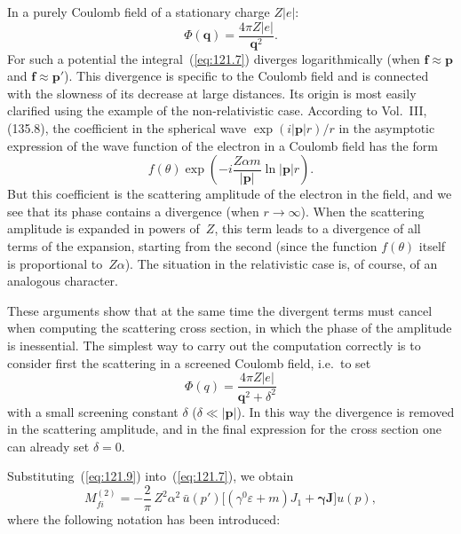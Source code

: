 
In a purely Coulomb field of a stationary charge $Z|e|$:
\[
\Phi(\mathbf{q}) = \frac{4\pi Z|e|}{\mathbf{q}^2}.
\]
For such a potential the integral~(\ref{eq:121.7}) diverges logarithmically (when $\mathbf{f} \approx \mathbf{p}$ and $\mathbf{f} \approx \mathbf{p}'$). This divergence is specific to the Coulomb field and is connected with the slowness of its decrease at large distances. Its origin is most easily clarified using the example of the non-relativistic case. According to Vol.~III, (135.8), the coefficient in the spherical wave $\exp(i|\mathbf{p}|r)/r$ in the asymptotic expression of the wave function of the electron in a Coulomb field has the form
\[
f(\theta)\exp\!\left(-i\frac{Z\alpha m}{|\mathbf{p}|}\ln|\mathbf{p}|r\right)\!.
\]
But this coefficient is the scattering amplitude of the electron in the field, and we see that its phase contains a divergence (when $r \to \infty$). When the scattering amplitude is expanded in powers of~$Z$, this term leads to a divergence of all terms of the expansion, starting from the second (since the function $f(\theta)$ itself is proportional to~$Z\alpha$). The situation in the relativistic case is, of course, of an analogous character.

These arguments show that at the same time the divergent terms must cancel when computing the scattering cross section, in which the phase of the amplitude is inessential. The simplest way to carry out the computation correctly is to consider first the scattering in a screened Coulomb field, i.e.\ to set
\begin{equation}
\Phi(q) = \frac{4\pi Z|e|}{\mathbf{q}^2 + \delta^2}
\label{eq:121.9}
\end{equation}
with a small screening constant $\delta$ ($\delta \ll |\mathbf{p}|$). In this way the divergence is removed in the scattering amplitude, and in the final expression for the cross section one can already set $\delta = 0$.

Substituting~(\ref{eq:121.9}) into~(\ref{eq:121.7}), we obtain
\[
M_{fi}^{(2)} = -\frac{2}{\pi}\,Z^2\alpha^2\,\bar{u}(p')\bigl[(\gamma^0\varepsilon + m)J_1 + \boldsymbol{\gamma}\mathbf{J}\bigr]u(p),
\]
where the following notation has been introduced:


